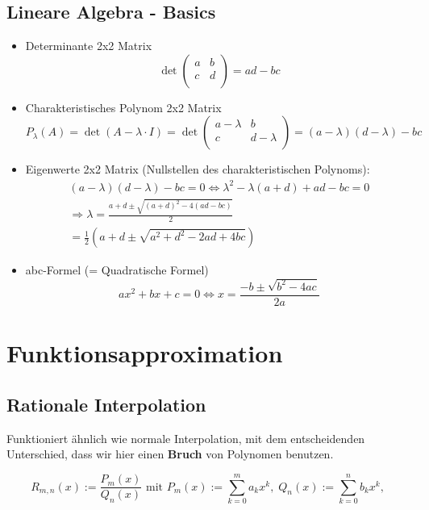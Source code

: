 \documentclass[a4paper]{article}
\begin{document}
\subsection{Lineare Algebra - Basics}
\begin{itemize}
	\item Determinante 2x2 Matrix
		\[
		\det \begin{pmatrix} 
			a & b \\
			c & d \\
		\end{pmatrix} 
		= ad - bc
		\] 
	\item Charakteristisches Polynom 2x2 Matrix
		\[
			P_\lambda (A)
			= \det (A - \lambda \cdot I) =
			\det \begin{pmatrix} 
				a - \lambda & b \\
				c & d - \lambda \\
			\end{pmatrix} =
			(a - \lambda) (d - \lambda) - bc
		\] 
	\item Eigenwerte 2x2 Matrix
		(Nullstellen des charakteristischen Polynoms):
		\begin{gather*}
			(a - \lambda) (d - \lambda) - bc = 0
			\Leftrightarrow 
			\lambda ^2 - \lambda (a + d) + ad - bc = 0 \\
			\Rightarrow
			\lambda = \frac{ a+d \pm \sqrt{(a+d) ^2 -4 (ad -bc)} }{ 2 } \\
			= \frac{ 1 }{ 2 } \left(
				a + d \pm \sqrt{
					a ^2 + d ^2 - 2 ad + 4 bc
				} 
			\right) 
		\end{gather*}
	\item abc-Formel (= Quadratische Formel)
		\[
			a x ^2 + b x + c = 0
			\Leftrightarrow 
			x = \frac{ -b \pm \sqrt{b ^2 - 4 ac} }{ 2a }
		\] 
\end{itemize}

\pagebreak

\section{Funktionsapproximation}

\subsection{Rationale Interpolation}

Funktioniert ähnlich wie normale Interpolation, mit dem entscheidenden
Unterschied, dass wir hier einen \textbf{Bruch} von Polynomen benutzen.

\[
	R_{m, n} (x) := \frac{ 
		P_m (x)
	}{ Q_n (x) } \text{ mit }
	P_m (x) := \sum_{k=0}^{m} a_k x^{k}, \;
	Q_n (x) := \sum_{k=0}^{n} b_k x^{k}, \;
\] 
\end{document}
